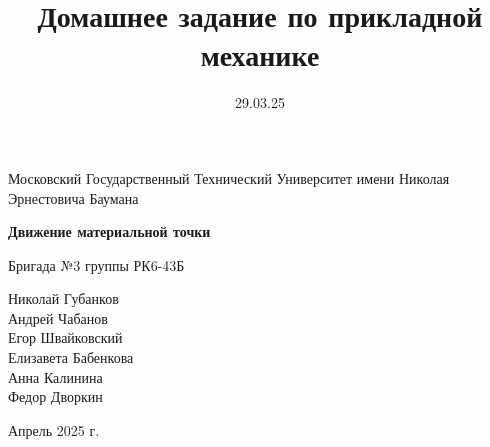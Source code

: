 \documentclass[12pt]{article} %
\title{Домашнее задание по прикладной механике}
\date{29.03.25}
\begin{document}
\begin{titlepage}
    \centering
    \vspace{0.8cm}
    \Large
    Московский Государственный Технический Университет имени Николая Эрнестовича Баумана\\

    \vspace*{3cm}

    \Huge
    \textbf{Движение материальной точки}

    \vspace{0.5cm}
    \LARGE
    Бригада №3 группы РК6-43Б

    \vspace{2.5cm}
    \large
    Николай Губанков\\
    Андрей Чабанов\\
    Егор Швайковский\\
    Елизавета Бабенкова\\
    Анна Калинина\\
    Федор Дворкин

    \vfill
    Апрель 2025 г.
\end{titlepage}

\clearpage

\tableofcontents
\clearpage


\clearpage

\clearpage

\clearpage

\clearpage

\clearpage
\end{document}
